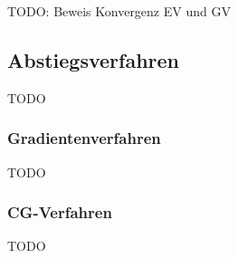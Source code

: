 TODO: Beweis Konvergenz EV und GV

\subsection{Abstiegsverfahren}

TODO

\subsubsection{Gradientenverfahren}

TODO

\subsubsection{CG-Verfahren}

TODO
